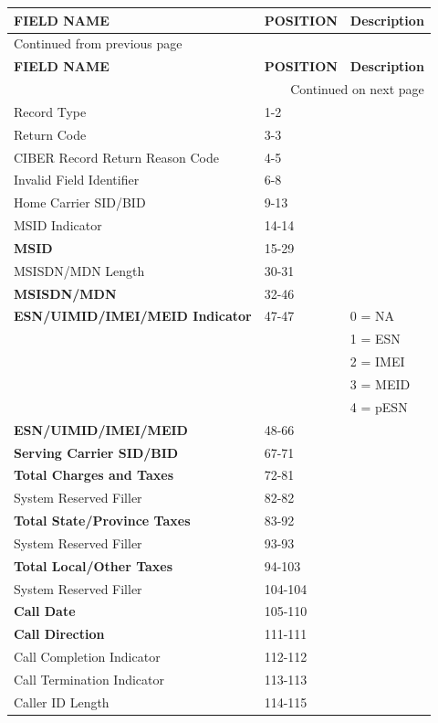 \documentclass[12pt,twoside]{article}
\begin{document}
\begin{longtable}{l|l|l}
\hline
\textbf{FIELD NAME} & \textbf{POSITION} & \textbf{Description}\\
\hline
\endfirsthead
\multicolumn{3}{l}{Continued from previous page} \\
\hline

\textbf{FIELD NAME} & \textbf{POSITION} & \textbf{Description} \\

\hline
\endhead
\hline\multicolumn{3}{r}{Continued on next page} \\
\endfoot
\endlastfoot
\hline
Record Type & 1-2 & \\
Return Code & 3-3 & \\
CIBER Record Return Reason Code & 4-5 & \\
Invalid Field Identifier & 6-8 & \\
Home Carrier SID/BID & 9-13 & \\
MSID Indicator & 14-14 & \\
\textbf{MSID} & 15-29 & \\
MSISDN/MDN Length & 30-31 & \\
\textbf{MSISDN/MDN} & 32-46 & \\
\textbf{ESN/UIMID/IMEI/MEID Indicator} & 47-47 & 0 = NA\\
&  & 1 = ESN\\
&  & 2 = IMEI\\
&  & 3 = MEID\\
&  & 4 = pESN\\
\textbf{ESN/UIMID/IMEI/MEID} & 48-66 & \\
\textbf{Serving Carrier SID/BID} & 67-71 & \\
\textbf{Total Charges and Taxes} & 72-81 & \\
System Reserved Filler & 82-82 & \\
\textbf{Total State/Province Taxes} & 83-92 & \\
System Reserved Filler & 93-93 & \\
\textbf{Total Local/Other Taxes} & 94-103 & \\
System Reserved Filler & 104-104 & \\
\textbf{Call Date} & 105-110 & \\
\textbf{Call Direction} & 111-111 & \\
Call Completion Indicator & 112-112 & \\
Call Termination Indicator & 113-113 & \\
Caller ID Length & 114-115 & \\

\end{longtable}
\end{document}
